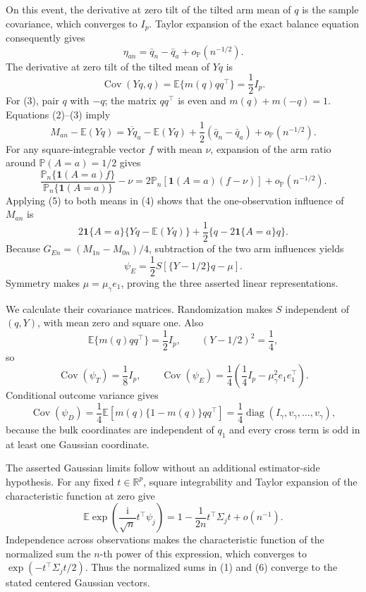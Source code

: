 On this event, the derivative at zero tilt of the tilted arm mean of \(q\) is the sample covariance, which converges to \(I_p\).  Taylor expansion of the exact balance equation consequently gives
\[
 \eta_{an}=\bar q_n-\bar q_a+o_{\mathbb P}(n^{-1/2}).
 \tag{2}
\]
The derivative at zero tilt of the tilted mean of \(Yq\) is
\[
 \operatorname{Cov}(Yq,q)=\mathbb E\{m(q)qq^\top\}=\frac12I_p.
 \tag{3}
\]
For (3), pair \(q\) with \(-q\); the matrix \(qq^\top\) is even and \(m(q)+m(-q)=1\).  Equations (2)--(3) imply
\[
 M_{an}-\mathbb E(Yq)
 =\overline{Yq}_a-\mathbb E(Yq)
  +\frac12(\bar q_n-\bar q_a)+o_{\mathbb P}(n^{-1/2}).
 \tag{4}
\]
For any square-integrable vector \(f\) with mean \(\nu\), expansion of the arm ratio around \(\mathbb P(A=a)=1/2\) gives
\[
 \frac{\mathbb P_n\{\mathbf1(A=a)f\}}
      {\mathbb P_n\{\mathbf1(A=a)\}}-\nu
 =2\mathbb P_n[\mathbf1(A=a)(f-\nu)]+o_{\mathbb P}(n^{-1/2}).
 \tag{5}
\]
Applying (5) to both means in (4) shows that the one-observation influence of \(M_{an}\) is
\[
 2\mathbf1\{A=a\}\{Yq-\mathbb E(Yq)\}
 +\frac12\{q-2\mathbf1\{A=a\}q\}.
\]
Because \(G_{En}=(M_{1n}-M_{0n})/4\), subtraction of the two arm influences yields
\[
 \psi_E=\frac12S\left[\{Y-1/2\}q-\mu\right].
 \tag{6}
\]
Symmetry makes \(\mu=\mu_\gamma e_1\), proving the three asserted linear representations.

We calculate their covariance matrices.  Randomization makes \(S\) independent of \((q,Y)\), with mean zero and square one.  Also
\[
 \mathbb E\{m(q)qq^\top\}=\frac12I_p,
 \qquad
 (Y-1/2)^2=\frac14,
\]
so
\[
 \operatorname{Cov}(\psi_T)=\frac18I_p,
 \qquad
 \operatorname{Cov}(\psi_E)
 =\frac14\left(\frac14I_p-\mu_\gamma^2e_1e_1^\top\right).
 \tag{7}
\]
Conditional outcome variance gives
\[
 \operatorname{Cov}(\psi_D)
 =\frac14\mathbb E\!\left[m(q)\{1-m(q)\}qq^\top\right]
 =\frac14\operatorname{diag}(I_\gamma,v_\gamma,\ldots,v_\gamma),
 \tag{8}
\]
because the bulk coordinates are independent of \(q_1\) and every cross term is odd in at least one Gaussian coordinate.

The asserted Gaussian limits follow without an additional estimator-side hypothesis.  For any fixed \(t\in\mathbb R^p\), square integrability and Taylor expansion of the characteristic function at zero give
\[
 \mathbb E\exp\!\left(\frac{\mathrm i}{\sqrt n}t^\top\psi_j\right)
 =1-\frac1{2n}t^\top\Sigma_jt+o(n^{-1}).
\]
Independence across observations makes the characteristic function of the normalized sum the \(n\)-th power of this expression, which converges to \(\exp(-t^\top\Sigma_jt/2)\).  Thus the normalized sums in (1) and (6) converge to the stated centered Gaussian vectors.

